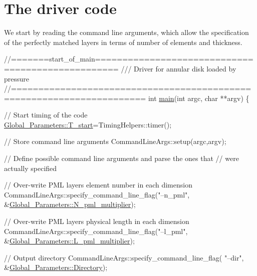  

\hypertarget{index_main}{}\section{The driver code}\label{index_main}
We start by reading the command line arguments, which allow the specification of the perfectly matched layers in terms of number of elements and thickness.

 
\begin{DoxyCodeInclude}
\textcolor{comment}{//=======start\_of\_main==================================================}
\textcolor{comment}{/// Driver for annular disk loaded by pressure}
\textcolor{comment}{}\textcolor{comment}{//======================================================================}
\textcolor{keywordtype}{int} \hyperlink{time__harmonic__elasticity__driver_8cc_a3c04138a5bfe5d72780bb7e82a18e627}{main}(\textcolor{keywordtype}{int} argc, \textcolor{keywordtype}{char} **argv)
\{

 \textcolor{comment}{// Start timing of the code}
 \hyperlink{namespaceGlobal__Parameters_a6106a50c4a420f4040e2ccd7d443267c}{Global\_Parameters::T\_start}=TimingHelpers::timer();

 \textcolor{comment}{// Store command line arguments}
 CommandLineArgs::setup(argc,argv);

 \textcolor{comment}{// Define possible command line arguments and parse the ones that}
 \textcolor{comment}{// were actually specified }

 \textcolor{comment}{// Over-write PML layers element number in each dimension}
 CommandLineArgs::specify\_command\_line\_flag(\textcolor{stringliteral}{"--n\_pml"},
                 &\hyperlink{namespaceGlobal__Parameters_a9af8f57814ac363b52f2a88d75864524}{Global\_Parameters::N\_pml\_multiplier});

 \textcolor{comment}{// Over-write PML layers physical length in each dimension}
 CommandLineArgs::specify\_command\_line\_flag(\textcolor{stringliteral}{"--l\_pml"},
                 &\hyperlink{namespaceGlobal__Parameters_a7a49a7bc4052082ccf10caf8ff7a52b6}{Global\_Parameters::L\_pml\_multiplier});

 \textcolor{comment}{// Output directory}
 CommandLineArgs::specify\_command\_line\_flag(
  \textcolor{stringliteral}{"--dir"}, &\hyperlink{namespaceGlobal__Parameters_a301ab922df72030c660b21328d6caf76}{Global\_Parameters::Directory});

\end{DoxyCodeInclude}


